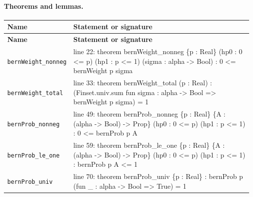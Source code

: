 \documentclass[10pt]{article}
\begin{document}
\paragraph{Theorems and lemmas.}
\begin{longtable}{>{\raggedright\arraybackslash}p{} >{\raggedright\arraybackslash}p{}}
\textbf{Name} & \textbf{Statement or signature} \\
\hline
\endfirsthead
\textbf{Name} & \textbf{Statement or signature} \\
\hline
\endhead
\texttt{bernWeight\_\allowbreak{}nonneg} & {\ttfamily\scriptsize line 22:\allowbreak{} theorem bernWeight\_\allowbreak{}nonneg \{p :\allowbreak{} Real\} (\allowbreak{}hp0 :\allowbreak{} 0 <=\allowbreak{} p)\allowbreak{} (\allowbreak{}hp1 :\allowbreak{} p <=\allowbreak{} 1)\allowbreak{} (\allowbreak{}sigma :\allowbreak{} alpha -\allowbreak{}> Bool)\allowbreak{} :\allowbreak{} 0 <=\allowbreak{} bernWeight p sigma} \\[0.45em]
\texttt{bernWeight\_\allowbreak{}total} & {\ttfamily\scriptsize line 33:\allowbreak{} theorem bernWeight\_\allowbreak{}total (\allowbreak{}p :\allowbreak{} Real)\allowbreak{} :\allowbreak{} (\allowbreak{}Finset.\allowbreak{}univ.\allowbreak{}sum fun sigma :\allowbreak{} alpha -\allowbreak{}> Bool =\allowbreak{}> bernWeight p sigma)\allowbreak{} =\allowbreak{} 1} \\[0.45em]
\texttt{bernProb\_\allowbreak{}nonneg} & {\ttfamily\scriptsize line 49:\allowbreak{} theorem bernProb\_\allowbreak{}nonneg \{p :\allowbreak{} Real\} \{A :\allowbreak{} (\allowbreak{}alpha -\allowbreak{}> Bool)\allowbreak{} -\allowbreak{}> Prop\} (\allowbreak{}hp0 :\allowbreak{} 0 <=\allowbreak{} p)\allowbreak{} (\allowbreak{}hp1 :\allowbreak{} p <=\allowbreak{} 1)\allowbreak{} :\allowbreak{} 0 <=\allowbreak{} bernProb p A} \\[0.45em]
\texttt{bernProb\_\allowbreak{}le\_\allowbreak{}one} & {\ttfamily\scriptsize line 59:\allowbreak{} theorem bernProb\_\allowbreak{}le\_\allowbreak{}one \{p :\allowbreak{} Real\} \{A :\allowbreak{} (\allowbreak{}alpha -\allowbreak{}> Bool)\allowbreak{} -\allowbreak{}> Prop\} (\allowbreak{}hp0 :\allowbreak{} 0 <=\allowbreak{} p)\allowbreak{} (\allowbreak{}hp1 :\allowbreak{} p <=\allowbreak{} 1)\allowbreak{} :\allowbreak{} bernProb p A <=\allowbreak{} 1} \\[0.45em]
\texttt{bernProb\_\allowbreak{}univ} & {\ttfamily\scriptsize line 70:\allowbreak{} theorem bernProb\_\allowbreak{}univ \{p :\allowbreak{} Real\} :\allowbreak{} bernProb p (\allowbreak{}fun \_\allowbreak{} :\allowbreak{} alpha -\allowbreak{}> Bool =\allowbreak{}> True)\allowbreak{} =\allowbreak{} 1} \\[0.45em]

\end{longtable}
\end{document}
